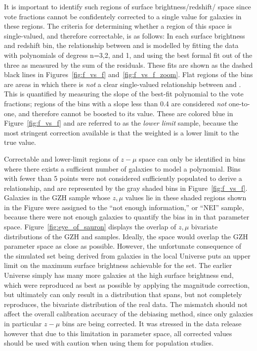 It is important to identify such regions of surface brightness/redshift/\ffeatures{} space since vote fractions cannot be confidentely corrected to a single value for galaxies in these regions. The criteria for determining whether a region of this space is single-valued, and therefore correctable, is as follows: In each surface brightness and redshift bin, the relationship between \ffeaturesz{} and \ffeaturesrest{} is modelled by fitting the data with polynomials of degress n=3,2, and 1, and using the best formal fit out of the three as measured by the sum of the residuals. These fits are shown as the dashed black lines in Figures~\ref{fig:f_vs_f} and~\ref{fig:f_vs_f_zoom}. Flat regions of the bins are areas in which there is \emph{not} a clear single-valued relationship between \ffeaturesz{} and \ffeaturesrest{}. This is quantified by measuring the slope of the best-fit polynomial to the vote fractions; regions of the bins with a slope less than 0.4 are considered \emph{not} one-to-one, and therefore \ffeaturesz{} cannot be boosted to its \ffeaturesrest{} value. These are colored blue in Figure~\ref{fig:f_vs_f} and are referred to as the \textit{lower limit} sample, because the most stringent correction available is that the weighted \ffeatures{} is a lower limit to the true value.

Correctable and lower-limit regions of $z-\mu$ space can only be identified in bins where there exists a sufficient number of \ferengi{} galaxies to model a polynomial. Bins with fewer than 5 points were not considered sufficiently populated to derive a relationship, and are represented by the gray shaded bins in Figure~\ref{fig:f_vs_f}. Galaxies in the GZH sample whose $z,\mu$ values lie in these shaded regions shown in the Figure were assigned to the ``not enough information,'' or ``NEI'' sample, because there were not enough \ferengi{} galaxies to quantify the bias in \ffeatures{} in that parameter space. Figure~\ref{fig:eye_of_sauron} displays the overlap of $z,\mu$ bivariate distributions of the GZH and \ferengi{} samples. Ideally, the \ferengi{} space would overlap the GZH parameter space as close as possible. However, the unfortunate consequence of the simulated set being derived from galaxies in the local Universe puts an upper limit on the maximum surface brightness achievable for the \ferengi{} set. The earlier Universe simply has many more galaxies at the high surface brightness end, which were reproduced as best as possible by applying the magnitude correction, but ultimately can only result in a distribution that spans, but not completely reproduces, the bivariate distribution of the real data. The mismatch should not affect the overall calibration accuracy of the debiasing method, since only galaxies in particular $z-\mu$ bins are being corrected. It was stressed in the data release \citep{Willett2016} however that due to this limitation in parameter space, all corrected values should be used with caution when using them for population studies.  


